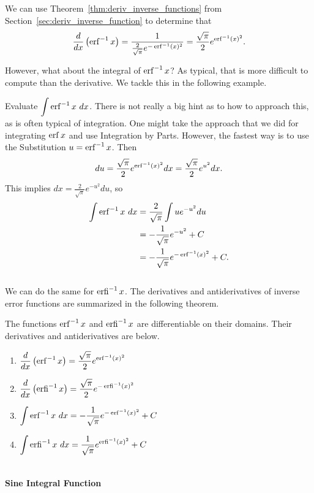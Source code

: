 We can use Theorem~\ref{thm:deriv_inverse_functions} from Section~\ref{sec:deriv_inverse_function} to determine that
$$\frac{d}{dx}\left(\operatorname{erf}^{-1} x\right) = \frac{1}{\frac{2}{\sqrt{\pi}}e^{-\operatorname{erf}^{-1}(x)^2}} = \frac{\sqrt{\pi}}{2} e^{\operatorname{erf}^{-1}(x)^2}.$$

However, what about the integral of $\operatorname{erf}^{-1} x$?  As typical, that is more difficult to compute than the derivative.  We tackle this in the following example.

{Evaluate $\ds \int \erf^{-1} x \ dx$.}
{There is not really a big hint as to how to approach this, as is often typical of integration.  One might take the approach that we did for integrating $\operatorname{erf} x$ and use Integration by Parts.  However, the fastest way is to use the Substitution $u= \operatorname{erf}^{-1} x$.  Then $$ du = \frac{\sqrt{\pi}}{2} e^{\operatorname{erf}^{-1}(x)^2} dx = \frac{\sqrt{\pi}}{2} e^{u^2} dx.$$  This implies $dx = \frac{2}{\sqrt{\pi}} e^{-u^2} du$, so
\begin{align*}
\displaystyle \int \operatorname{erf}^{-1} x \ dx &= \frac{2}{\sqrt{\pi}}\int ue^{-u^2} du\\
&= -\frac{1}{\sqrt{\pi}} e^{-u^2} +C\\
&= -\frac{1}{\sqrt{\pi}} e^{-\operatorname{erf}^{-1}(x)^2} +C.
\end{align*}
}\\

We can do the same for $\operatorname{erfi}^{-1} x$.  The derivatives and antiderivatives of inverse error functions are summarized in the following theorem.

{ The functions $\operatorname{erf}^{-1} x$ and $\operatorname{erfi}^{-1} x$ are differentiable on their domains.  Their derivatives and antiderivatives are below.
\begin{enumerate}
\item $\displaystyle \frac{d}{dx} \left(\operatorname{erf}^{-1} x\right) = \frac{\sqrt{\pi}}{2} e^{\operatorname{erf}^{-1}(x)^2}$
\item $\displaystyle \frac{d}{dx} \left(\operatorname{erfi}^{-1} x\right) = \frac{\sqrt{\pi}}{2} e^{-\operatorname{erfi}^{-1}(x)^2}$
\item $\displaystyle \int \operatorname{erf}^{-1} x \ dx = -\frac{1}{\sqrt{\pi}} e^{-\operatorname{erf}^{-1}(x)^2} +C$
\item $\displaystyle \int \operatorname{erfi}^{-1} x \ dx = \frac{1}{\sqrt{\pi}} e^{\operatorname{erfi}^{-1}(x)^2} +C$
\end{enumerate}
}\\

\noindent\textbf{\large Sine Integral Function}\\

